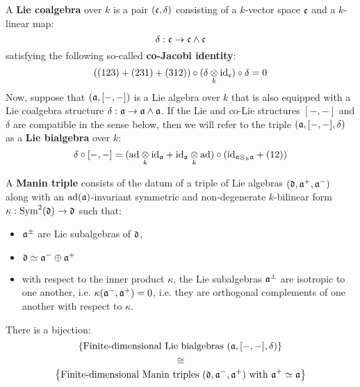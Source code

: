             \begin{definition} \label{def: lie_co/bialgebras}
                A \textbf{Lie coalgebra} over $k$ is a pair $(\mathfrak{c}, \delta)$ consisting of a $k$-vector space $\mathfrak{c}$ and a $k$-linear map:
                    $$\delta: \mathfrak{c} \to \mathfrak{c} \wedge \mathfrak{c}$$
                satisfying the following so-called \textbf{co-Jacobi identity}:
                    $$((123) + (231) + (312)) \circ (\delta \tensor_k \id_\c) \circ \delta = 0$$
                Now, suppose that $(\mathfrak{a}, [-, -])$ is a Lie algebra over $k$ that is also equipped with a Lie coalgebra structure $\delta: \mathfrak{a} \to \mathfrak{a} \wedge \mathfrak{a}$. If the Lie and co-Lie structures $[-, -]$ and $\delta$ are compatible in the sense below, then we will refer to the triple $(\mathfrak{a}, [-, -], \delta)$ as a \textbf{Lie bialgebra} over $k$:
                    $$\delta \circ [-, -] = (\ad \tensor_k \id_{\a} + \id_{\a} \tensor_k \ad) \circ (\id_{\a \tensor_k \a} + (12))$$
            \end{definition}
            \begin{definition} \label{def: manin_triples}
                A \textbf{Manin triple} consists of the datum of a triple of Lie algebras $(\mathfrak{d}, \mathfrak{a}^+, \mathfrak{a}^-)$ along with an $\mathrm{ad}(\mathfrak{a})$-invariant symmetric and non-degenerate $k$-bilinear form $\kappa: \mathrm{Sym}^2(\mathfrak{d}) \to \mathfrak{d}$ such that:
                    \begin{itemize}
                        \item $\mathfrak{a}^{\pm}$ are Lie subalgebras of $\mathfrak{d}$,
                        \item $\mathfrak{d} \simeq \mathfrak{a}^- \oplus \mathfrak{a}^+$
                        \item with respect to the inner product $\kappa$, the Lie subalgebras $\mathfrak{a}^{\pm}$ are isotropic to one another, i.e. $\kappa(\mathfrak{a}^-, \mathfrak{a}^+) = 0$, i.e. they are orthogonal complements of one another with respect to $\kappa$.
                    \end{itemize}
            \end{definition}
            \begin{proposition} \label{prop: manin_triples_classify_lie_bialgebras}
                There is a bijection:
                    $$\left\{ \text{Finite-dimensional Lie bialgebras $(\mathfrak{a}, [-, -], \delta)$} \right\}$$
                    $$\cong$$
                    $$\left\{ \text{Finite-dimensional Manin triples $(\mathfrak{d}, \mathfrak{a}^-, \mathfrak{a}^+)$ with $\mathfrak{a}^+ \simeq \mathfrak{a}$} \right\}$$
            \end{proposition}
